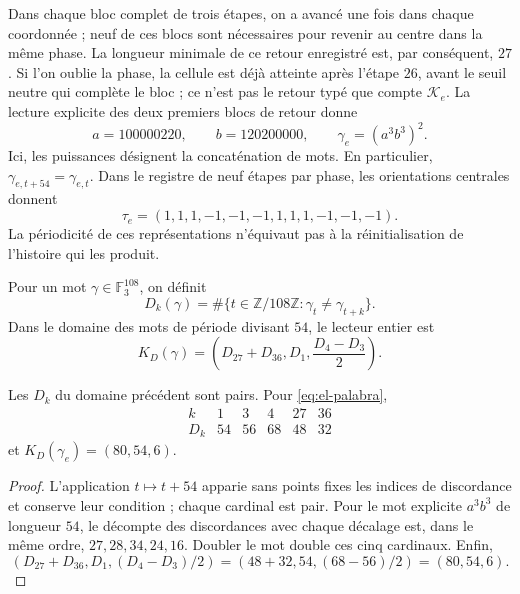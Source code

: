 Dans chaque bloc complet de trois étapes, on a avancé une fois dans chaque
coordonnée ; neuf de ces blocs sont nécessaires pour revenir au centre dans
la même phase. La longueur minimale de ce retour enregistré est, par
conséquent, \(27\). Si l'on oublie la phase, la cellule est déjà atteinte après
l'étape \(26\), avant le seuil neutre qui complète le bloc ; ce n'est pas
le retour typé que compte \(\mathcal K_e\). La lecture explicite
des deux premiers blocs de retour donne
\begin{equation}
 a=100000220,\qquad b=120200000,\qquad
 \gamma_e=(a^3b^3)^2.
 \label{eq:el-palabra}
\end{equation}
Ici, les puissances désignent la concaténation de mots. En particulier,
\(\gamma_{e,t+54}=\gamma_{e,t}\). Dans le registre de neuf étapes par
phase, les orientations centrales donnent
\begin{equation}
 \tau_e=(1,1,1,-1,-1,-1,1,1,1,-1,-1,-1).
 \label{eq:el-tau}
\end{equation}
La périodicité de ces représentations n'équivaut pas à la réinitialisation de l'histoire qui les produit.

\begin{definition}
Pour un mot \(\gamma\in\mathbb F_3^{108}\), on définit
\[
 D_k(\gamma)=\#\{t\in\mathbb Z/108\mathbb Z:
                   \gamma_t\ne\gamma_{t+k}\}.
\]
Dans le domaine des mots de période divisant \(54\), le lecteur entier est
\begin{equation}
 K_D(\gamma)=\left(D_{27}+D_{36},D_1,\frac{D_4-D_3}{2}\right).
 \label{eq:el-kd}
\end{equation}
\end{definition}

\begin{lemma}
Les \(D_k\) du domaine précédent sont pairs. Pour
\eqref{eq:el-palabra},
\[
 \begin{array}{c|rrrrr}
 k&1&3&4&27&36\\\hline
 D_k&54&56&68&48&32
 \end{array}
\]
et \(K_D(\gamma_e)=(80,54,6)\).
\end{lemma}
\begin{proof}
L'application \(t\mapsto t+54\) apparie sans points fixes les indices de discordance et conserve leur condition ; chaque cardinal est pair. Pour le mot explicite \(a^3b^3\) de longueur \(54\), le décompte des discordances avec chaque décalage est, dans le même ordre, \(27,28,34,24,16\). Doubler le mot double ces cinq cardinaux. Enfin,
\[
 (D_{27}+D_{36},D_1,(D_4-D_3)/2)
 =(48+32,54,(68-56)/2)=(80,54,6).
\]
\end{proof}

